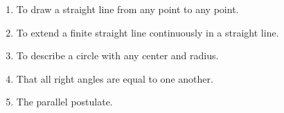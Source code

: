 
\begin{frame}{}
\end{frame}

\begin{frame}{}
\end{frame}

%

\begin{frame}{}

  \begin{enumerate}[(1)]
    \item To draw a straight line from any point to any point.
    \item To extend a finite straight line continuously in a straight line.
    \item To describe a circle with any center and radius.
    \item That all right angles are equal to one another.
    \item The parallel postulate.
  \end{enumerate}
\end{frame}

\begin{frame}
\end{frame}
